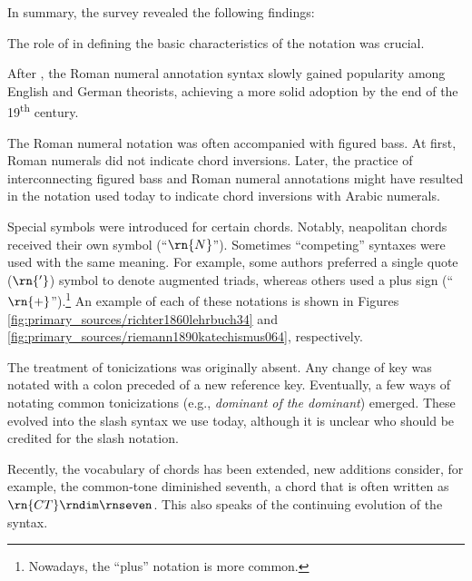 In summary, the survey revealed the following findings:

The role of \textcite{weber1818versuch} in defining the
basic characteristics of the notation was crucial.


After \textcite{weber1818versuch}, the Roman numeral
annotation syntax slowly gained popularity among English and
German theorists, achieving a more solid adoption by the end
of the 19\textsuperscript{th} century.

 The Roman numeral notation was often accompanied with
figured bass. At first, Roman numerals did not indicate
chord inversions. Later, the practice of interconnecting
figured bass and Roman numeral annotations might have
resulted in the notation used today to indicate chord
inversions with Arabic numerals.

Special symbols were introduced for certain chords. Notably,
\gls{neapolitan} chords received their own symbol
(``$\rn{N}$''). Sometimes ``competing'' syntaxes were used
with the same meaning. For example, some authors preferred a
single quote ($\rn{'}$) symbol to denote augmented triads,
whereas others used a plus sign
(``$\rn{+}$'').\footnote{Nowadays, the ``plus'' notation is
more common.} An example of each of these notations is shown
in Figures \ref{fig:primary_sources/richter1860lehrbuch34}
and \ref{fig:primary_sources/riemann1890katechismus064},
respectively.

The treatment of tonicizations was originally absent. Any
change of key was notated with a colon preceded of a new
reference key. Eventually, a few ways of notating common
tonicizations (e.g., \emph{dominant of the dominant})
emerged. These evolved into the slash syntax we use today,
although it is unclear who should be credited for the slash
notation.

Recently, the vocabulary of chords has been extended, new
additions consider, for example, the common-tone diminished
seventh, a chord that is often written as
$\rn{CT}\rndim\rnseven$. This also speaks of the continuing
evolution of the syntax.
